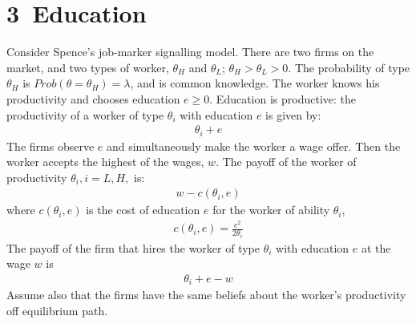 \documentclass[a4paper]{article}
\begin{document}
\section*{3\ Education}
Consider Spence's job-marker signalling model. There are two firms on the market, and
two types of worker, $\theta_H$ and $\theta_L$; $\theta_H > \theta_L > 0$. The probability of type $\theta_H$ is $Prob(\theta =
\theta_H) = \lambda$, and is common knowledge. The worker knows his productivity and chooses
education $e \ge 0$. Education is productive: the productivity of a worker of type $\theta_i$ with
education $e$ is given by:
\begin{align*}
\theta_i + e
\end{align*}
The firms observe $e$ and simultaneously make the worker a wage offer. Then the worker
accepts the highest of the wages, $w$. The payoff of the worker of productivity $\theta_i, i = L, H,$ is:
\begin{align*}
w - c(\theta_i, e)
\end{align*}
where $c(\theta_i, e)$ is the cost of education $e$ for the worker of ability $\theta_i$,
\begin{align*}
c(\theta_i, e) = \frac{e^2}{2\theta_i}
\end{align*}
The payoff of the firm that hires the worker of type $\theta_i$ with education $e$ at the wage $w$ is
\begin{align*}
\theta_i + e - w
\end{align*}
Assume also that the firms have the same beliefs about the worker's productivity off equilibrium path. 
\end{document}
